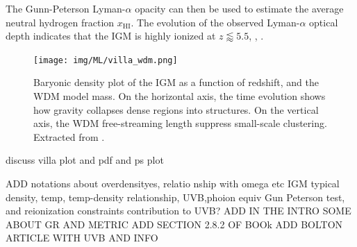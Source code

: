 The Gunn-Peterson Lyman-$\alpha$ opacity can then be used to estimate the average neutral hydrogen fraction $x_\text{HI}$. The evolution of the observed Lyman-$\alpha$ optical depth indicates that the IGM is highly ionized at $z\lessapprox 5.5$, \cite{Becker_2001_GP_trough}, \cite{Ian_model_inde_reio}.

\begin{figure}
    \centering
    \texttt{[image: img/ML/villa\_wdm.png]}
    \caption{Baryonic density plot of the IGM as a function of redshift, and the WDM model mass. On the horizontal axis, the time evolution shows how gravity collapses dense regions into structures. On the vertical axis, the WDM free-streaming length suppress small-scale clustering. Extracted from \cite{Villasenor_2023}.}
    \label{fig:villasenor_wdm}
\end{figure}

discuss villa plot and pdf and ps plot

ADD notations about overdensityes, relatio nship with omega etc
IGM typical density, temp, temp-density relationship, UVB,phoion equiv
Gun Peterson test, and reionization constraints
contribution to UVB?
ADD IN THE INTRO SOME ABOUT GR AND METRIC
ADD SECTION 2.8.2 OF BOOk
ADD BOLTON ARTICLE WITH UVB AND INFO